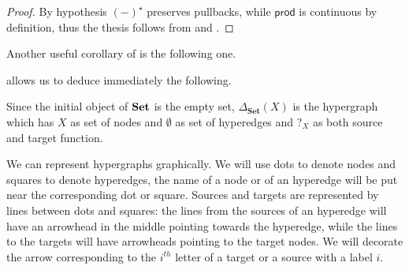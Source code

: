 \documentclass[runningheads,envcountsect]{lipics-v2021}
\newcommand{\Set}{\mathbf{Set}}
\newcommand{\catname}[1]{\textbf{\textup{#1}}}
\newcommand{\hyp}{\catname{Hyp}}
\newcommand{\pro}{\mathsf{prod}}
\begin{document}
\begin{proof}
	By hypothesis $(-)^\star$ preserves pullbacks, while $\pro$ is continuous by definition, thus the thesis follows from   and .   
\end{proof}

Another useful corollary of  is the following one.


 allows us to deduce immediately the following.


\begin{example}Since the initial object of $\catname{Set}$ is the empty set,  $\Delta_{\Set}(X)$ is the hypergraph which has $X$ as set of nodes and $\emptyset$ as set of hyperedges and $?_X$ as both source and target function.
\end{example}


We can represent hypergraphs graphically. We will use dots to denote nodes and squares to denote hyperedges, the name of a node or of an hyperedge will be put near the corresponding dot or square. Sources and targets are represented by lines between dots and squares: the lines from the sources of an hyperedge will have an arrowhead in the middle pointing towards the hyperedge, while the lines to the targets will have arrowheads pointing to the target nodes.  We will decorate the arrow corresponding to the $i^{th}$ letter of a target or a source with a label $i$.
\end{document}
